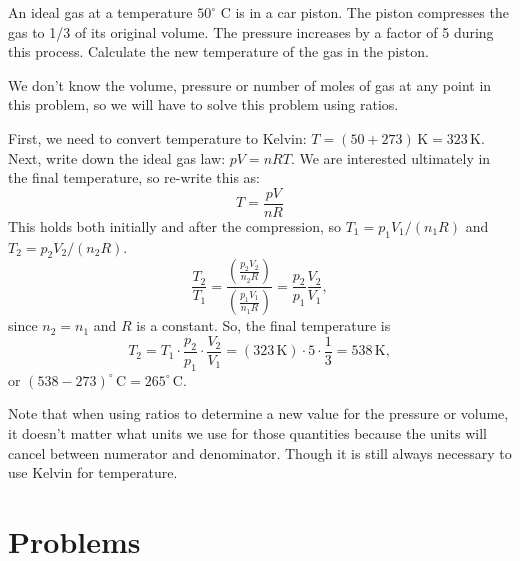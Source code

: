 \begin{example}
  An ideal gas at a temperature $50^{\circ}$ C is in a car piston.
  The piston compresses the gas to 1/3 of its original volume.  The
  pressure increases by a factor of 5 during this process.  Calculate
  the new temperature of the gas in the piston.

  

\solution We don't know the volume, pressure or number of moles of
  gas at any point in this problem, so we will have to solve this
  problem using ratios.

  First, we need to convert temperature to Kelvin: $T = (50+273)
  \,\text{K} = 323 \,\text{K}$.  Next, write down the ideal gas law: $pV
  = nRT$.  We are interested ultimately in the final temperature, so
  re-write this as:
  \begin{equation}
    T = \frac{pV}{nR}
  \end{equation}
  This holds both initially and after the compression, so $T_1 =
  p_1V_1/(n_1R)$ and $T_2 = p_2V_2/(n_2R)$.  
\begin{equation}
  \frac{T_2}{T_1} = \frac{\displaystyle\left(\frac{p_2V_2}{n_2R}\right) }
 {\displaystyle\left( \frac{p_1V_1}{n_1R}\right) } 
  = \frac{p_2}{p_1}\frac{V_2}{V_1},
\end{equation}
since $n_2 = n_1$ and $R$ is a constant.  So, the final temperature is
\begin{equation}
  T_2 = T_1 \cdot \frac{p_2}{p_1}\cdot\frac{V_2}{V_1} = 
  (323\,\text{K})\cdot 5 \cdot \frac{1}{3}
  = 538 \,\text{K} ,
\end{equation}
or $(538 - 273)^{\circ}\,\text{C} = 265^{\circ}\,\text{C}$.

Note that when using ratios to determine a new value for the pressure
or volume, it doesn't matter what units we use for those quantities
because the units will cancel between numerator and denominator. 
Though it is still always necessary to use Kelvin for temperature.
\end{example}



\section*{Problems}


